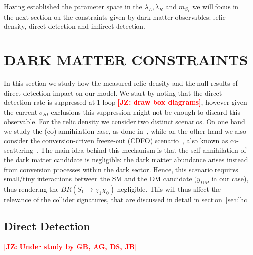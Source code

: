 \documentclass[11pt]{cernrep}
\def\JZ#1{{\bf  \textcolor{red}{[JZ: {#1}]}}}
\begin{document}
Having established the parameter space in the $\lambda_L, \lambda_R$ and $m_{S_1}$ we will focus in the next section on the constraints given by dark matter observables: relic density, direct detection and indirect detection.




\section{DARK MATTER CONSTRAINTS}

In this section we study how the measured relic density and the null results of direct detection impact on our model. We start by noting that the direct detection rate is suppressed at 1-loop \JZ{draw box diagrams}, however given the current $\sigma_{SI}$ exclusions this suppression might not be enough to discard this observable. For the relic density we consider two distinct scenarios. On one hand we study the (co)-annihilation case, as done in~\cite{Baker:2015qna}, while on the other hand we also consider the conversion-driven freeze-out (CDFO) scenario~\cite{Garny:2017rxs}, also known as co-scattering~\cite{DAgnolo:2017dbv}. The main idea behind this mechanism is that the self-annihilation of the dark matter candidate is negligible: the dark matter abundance arises instead from conversion processes within the dark sector. Hence, this scenario requires small/tiny interactions between the SM and the DM candidate ($y_{DM}$ in our case), thus rendering the $BR(S_1 \to \chi_1 \chi_0)$ negligible. This will thus affect the relevance of the collider signatures, that are discussed in detail in section~\ref{sec:lhc}

\subsection{Direct Detection}
\JZ{Under study by GB, AG, DS, JB}
\end{document}
